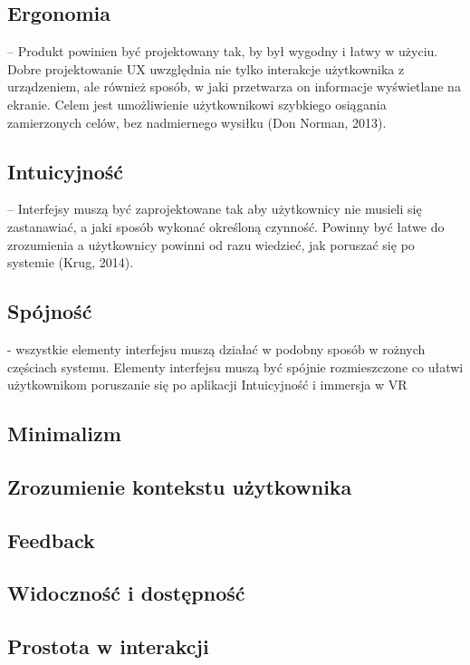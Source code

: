 \subsection{Ergonomia} – Produkt powinien być projektowany tak, by był wygodny i łatwy w użyciu. Dobre projektowanie UX uwzględnia nie tylko interakcje użytkownika z urządzeniem, ale również sposób, w jaki przetwarza on informacje wyświetlane na ekranie. Celem jest umożliwienie użytkownikowi szybkiego osiągania zamierzonych celów, bez nadmiernego wysiłku (Don Norman, 2013).

\subsection{Intuicyjność} – Interfejsy muszą być zaprojektowane tak aby użytkownicy nie musieli się zastanawiać, a jaki sposób wykonać określoną czynność. Powinny być łatwe do zrozumienia a użytkownicy powinni od razu wiedzieć, jak poruszać się po systemie (Krug, 2014).

\subsection{Spójność} - wszystkie elementy interfejsu muszą działać w podobny sposób w rożnych częściach systemu. Elementy interfejsu muszą być spójnie rozmieszczone co ułatwi użytkownikom poruszanie się po aplikacji
Intuicyjność i immersja w VR

\subsection{Minimalizm} 

\subsection{Zrozumienie kontekstu użytkownika}

\subsection{Feedback}

\subsection{Widoczność i dostępność}

\subsection{Prostota w interakcji}